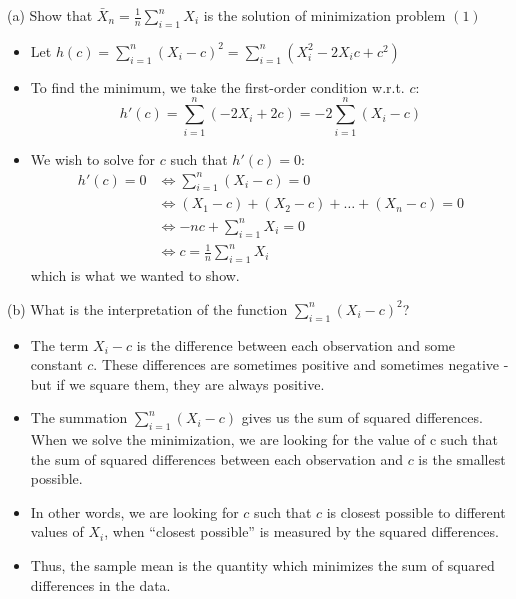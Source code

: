 \documentclass[
  11pt,
  ignorenonframetext,
]{beamer}
\providecommand{\tightlist}{%
  \setlength{\itemsep}{0pt}\setlength{\parskip}{0pt}}
\begin{document}
\begin{frame}{(a) Show that \(\bar{X}_n = \frac{1}{n} \sum_{i=1}^n X_i\)
is the solution of \quad  minimization problem \((1)\)}
\protect\hypertarget{a-show-that-barx_n-frac1n-sum_i1n-x_i-is-the-solution-of-minimization-problem-1}{}
\pause

\begin{itemize}
\tightlist
\item
  Let
  \(h(c) = \sum_{i=1}^{n} \left(X_i - c\right)^2 = \sum_{i=1}^{n}\left(X_i^2 - 2 X_i c + c^2\right)\)
\end{itemize}

\pause

\begin{itemize}
\tightlist
\item
  To find the minimum, we take the first-order condition w.r.t. \(c\):
  \[
  h'(c) = \sum_{i=1}^{n} \left(-2 X_i + 2 c\right) = -2\sum_{i=1}^n \left(X_i-c\right)
  \]
\end{itemize}

\pause

\begin{itemize}
\tightlist
\item
  We wish to solve for \(c\) such that \(h'(c) = 0\): \[
  \begin{aligned}
  h'(c) = 0 &\Leftrightarrow \sum_{i=1}^n \left(X_i-c\right) = 0\\
  &\Leftrightarrow \left(X_1-c\right) + \left(X_2-c\right) + \ldots + \left(X_n-c\right) = 0\\
  &\Leftrightarrow -nc + \sum_{i=1}^{n} X_i = 0\\
  &\Leftrightarrow c = \frac{1}{n} \sum_{i=1}^n X_i
  \end{aligned}
  \] which is what we wanted to show.
\end{itemize}
\end{frame}

\begin{frame}{(b) What is the interpretation of the function
\(\sum_{i=1}^{n} \left(X_i - c\right)^2\)?}
\protect\hypertarget{b-what-is-the-interpretation-of-the-function-sum_i1n-leftx_i---cright2}{}
\begin{itemize}
\item
  The term \(X_i-c\) is the difference between each observation and some
  constant \(c\). These differences are sometimes positive and sometimes
  negative - but if we square them, they are always positive.
\item
  The summation \(\sum_{i=1}^n \left(X_i-c\right)\) gives us the sum of
  squared differences. When we solve the minimization, we are looking
  for the value of c such that the sum of squared differences between
  each observation and \(c\) is the smallest possible.
\item
  In other words, we are looking for \(c\) such that \(c\) is closest
  possible to different values of \(X_i\), when ``closest possible'' is
  measured by the squared differences.
\item
  Thus, the sample mean is the quantity which minimizes the sum of
  squared differences in the data.
\end{itemize}
\end{frame}
\end{document}
